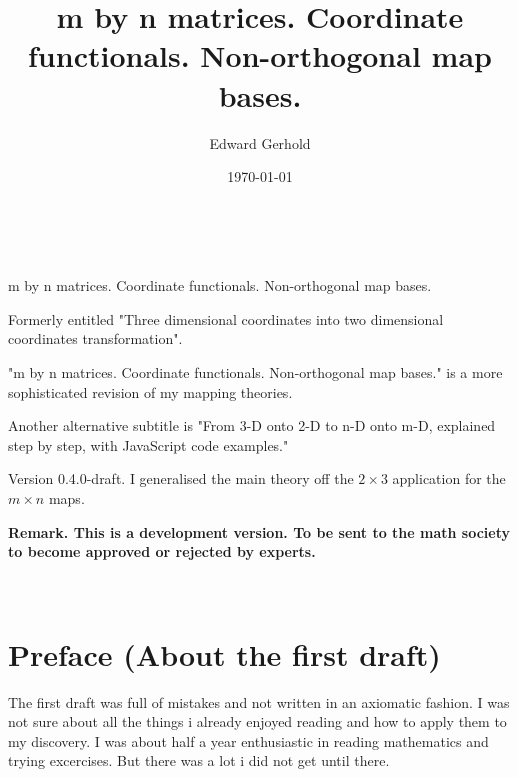 \documentclass[a4paper]{article}
\begin{document}
\begin{center}

%
%
%
%


\title{m by n matrices. Coordinate functionals. Non-orthogonal map bases. }\\
\author{Edward Gerhold}

m by n matrices. Coordinate functionals. Non-orthogonal map bases. 

Formerly entitled  "Three dimensional coordinates into two dimensional coordinates transformation".

"m by n matrices. Coordinate functionals. Non-orthogonal map bases." is a more sophisticated revision of my mapping theories.

Another alternative subtitle is "From 3-D onto 2-D to n-D onto m-D, explained step by step, with JavaScript code examples."



\date{\today}
\maketitle

Version 0.4.0-draft. I generalised the main theory off the $2 \times 3$ application for the $m \times n$ maps.  


\textbf{Remark. This is a development version. To be sent to the math society to become approved or rejected by experts.}
\end{center}

\tableofcontents\\

\section{Preface (About the first draft)}

The first draft was full of mistakes and not written in an axiomatic fashion. I was not sure about all the things i already enjoyed reading and how to apply them to my discovery. I was about half a year enthusiastic in reading mathematics and trying excercises. But there was a lot i did not get until there. 
\end{document}
